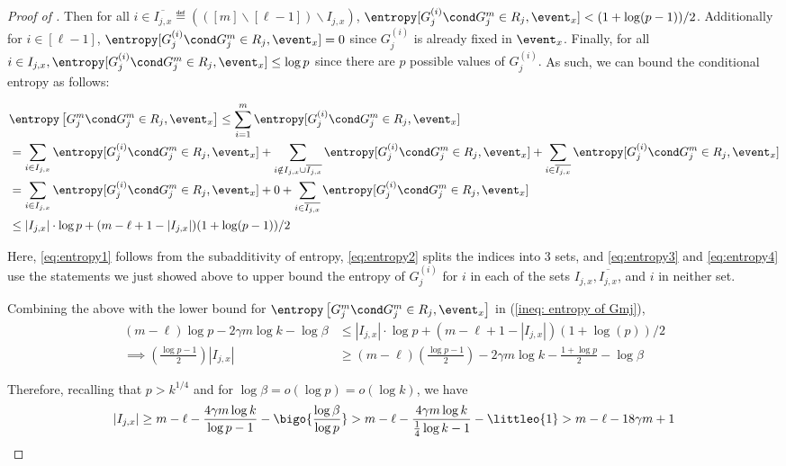 \begin{proof}[Proof of ]
		
		Then for all $i\in \overline{I_{j,x}}\eqdef \left(([m]\backslash[\ell-1]) \backslash I_{j,x}\right)$, $\entropy[G_j^{(i)}\cond G_j^m\in R_j,\event_x ] < (1+\log(p-1))/2$. Additionally for $i\in [\ell-1]$, $\entropy[G_j^{(i)}\cond G_j^m\in R_j,\event_x ]=0$ since $G_j^{(i)}$ is already fixed in $\event_x$. {\color{black} Finally, for all $i \in I_{j,x}, \entropy[G_j^{(i)}\cond G_j^m\in R_j,\event_x ] \le \log p$ since there are $p$ possible values of $G_j^{(i)}$.} As such, we can bound the conditional entropy as follows:

		\begin{align}
			\label{eq:entropy1}&\entropy\left[ G^m_j \cond G^m_j\in R_j,\event_x \right]
			\le  \sum_{i=1}^{m} \entropy[G_j^{(i)}\cond G_j^m\in R_j,\event_x ]\\
			\label{eq:entropy2}&=  \sum_{i\in I_{j,x} } \entropy[G_j^{(i)}\cond G_j^m\in R_j,\event_x ] + \sum_{i \notin I_{j,x} \cup \overline{I_{j,x}}} \entropy[G_j^{(i)}\cond G_j^m\in R_j,\event_x ] + \sum_{i\in \overline{I_{j,x}}} \entropy[G_j^{(i)}\cond G_j^m\in R_j,\event_x ] \\
			\label{eq:entropy3}&= \sum_{i\in I_{j,x} } \entropy[G_j^{(i)}\cond G_j^m\in R_j,\event_x ] + 0 + \sum_{i\in \overline{I_{j,x}}} \entropy[G_j^{(i)}\cond G_j^m\in R_j,\event_x ] \\
			\label{eq:entropy4}&\le  |I_{j,x}| \cdot \log p + (m-\ell+1 - |I_{j,x}|)(1+\log(p-1))/2
		\end{align}
		
%
{\color{black}Here, \eqref{eq:entropy1} %
%
%
follows from
the  %
subadditivity of entropy, \eqref{eq:entropy2} splits the indices into 3 sets, and \eqref{eq:entropy3} and \eqref{eq:entropy4} use the statements we just showed above to upper bound the entropy of $G_j^{(i)}$ for $i$ in %
%
each of the %
sets $I_{j,x}, \overline{I_{j,x}}$, and $i$ in neither set.}
		
Combining the above with  the lower bound for $\entropy\left[ G^m_j \cond G^m_j\in R_j,\event_x \right]$ in (\ref{ineq: entropy of Gmj}), 
		\begin{align*}
			 (m-\ell)\log p - 2\gamma m\log k - \log \beta & \le |I_{j,x}| \cdot \log p + (m-\ell+1 - |I_{j,x}|)(1+\log(p))/2\\
			\implies \left( \frac{\log p -1}{2} \right) |I_{j,x}| & \ge  (m-\ell)\left(\frac{\log p -1}{2}\right)-2\gamma m\log k -\frac{1+\log p}{2} -\log \beta
		\end{align*}

		Therefore, recalling that $p> k^{1/4}$ 
		{and for $\log \beta =o(\log p)=o(\log k)$}, we have
		\[|I_{j,x}| \ge  m-\ell -\frac{4\gamma m \log k}{\log p-1} - \bigo{\frac{\log \beta}{\log p}}>m-\ell -\frac{4\gamma m \log k}{\frac{1}{4}\log k-1} - \littleo{1} >m-\ell - 18\gamma m + 1 \]
		

\end{proof}
